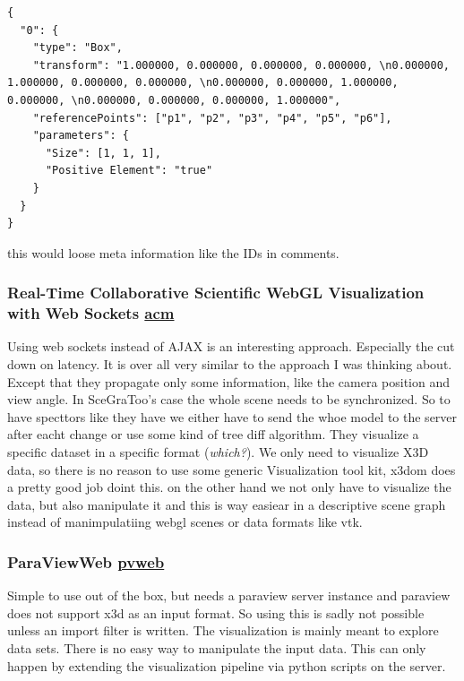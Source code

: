 \begin{verbatim}
{
  "0": {
    "type": "Box",
    "transform": "1.000000, 0.000000, 0.000000, 0.000000, \n0.000000, 1.000000, 0.000000, 0.000000, \n0.000000, 0.000000, 1.000000, 0.000000, \n0.000000, 0.000000, 0.000000, 1.000000",
    "referencePoints": ["p1", "p2", "p3", "p4", "p5", "p6"],
    "parameters": {
      "Size": [1, 1, 1],
      "Positive Element": "true"
    }
  }
}
\end{verbatim}

\begin{itemize*}
\item
  this would loose meta information like the IDs in comments.
\end{itemize*}

\subsubsection{\texorpdfstring{Real-Time Collaborative Scientific WebGL
Visualization with Web Sockets
\href{http://doi.acm.org/10.1145/2338714.2338721}{acm}}{Real-Time Collaborative Scientific WebGL Visualization with Web Sockets acm}}\label{real-time-collaborative-scientific-webgl-visualization-with-web-sockets-acm}

Using web sockets instead of AJAX is an interesting approach. Especially
the cut down on latency. It is over all very similar to the approach I
was thinking about. Except that they propagate only some information,
like the camera position and view angle. In SceGraToo's case the whole
scene needs to be synchronized. So to have specttors like they have we
either have to send the whoe model to the server after eacht change or
use some kind of tree diff algorithm. They visualize a specific dataset
in a specific format (\emph{which?}). We only need to visualize X3D
data, so there is no reason to use some generic Visualization tool kit,
x3dom does a pretty good job doint this. on the other hand we not only
have to visualize the data, but also manipulate it and this is way
easiear in a descriptive scene graph instead of manimpulatiing webgl
scenes or data formats like vtk.

\subsubsection{\texorpdfstring{ParaViewWeb
\href{http://paraviewweb.kitware.com/}{pvweb}}{ParaViewWeb pvweb}}\label{paraviewweb-pvweb}

Simple to use out of the box, but needs a paraview server instance and
paraview does not support x3d as an input format. So using this is sadly
not possible unless an import filter is written. The visualization is
mainly meant to explore data sets. There is no easy way to manipulate
the input data. This can only happen by extending the visualization
pipeline via python scripts on the server.

